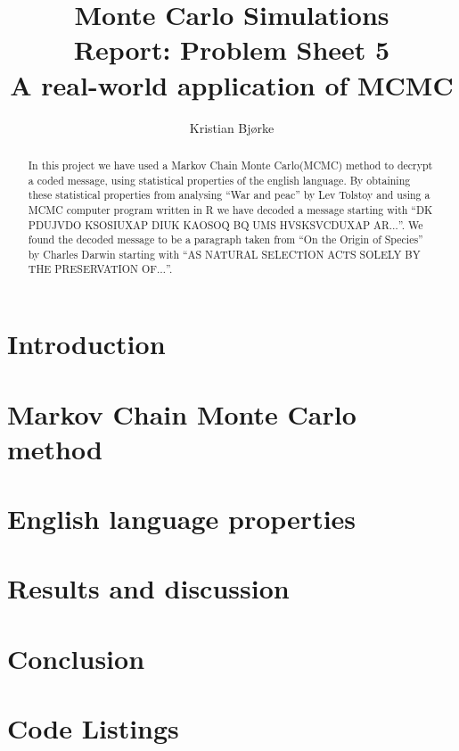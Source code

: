 \documentclass[a4paper, 11pt]{article}
\title{Monte Carlo Simulations \\
Report: Problem Sheet 5 \\ A real-world application of MCMC}
\author{Kristian Bjørke}
\begin{document}
\maketitle

\begin{abstract}
  In this project we have used a Markov Chain Monte Carlo(MCMC) method to
  decrypt a coded message, using statistical properties of the english
  language. By obtaining these statistical properties from analysing 
  ``War and peac'' by Lev Tolstoy and using a MCMC computer program
  written in R we have  decoded a message starting with ``DK PDUJVDO 
  KSOSIUXAP DIUK  KAOSOQ BQ UMS HVSKSVCDUXAP AR$\dots$''. We found the 
  decoded message to be a paragraph taken from ``On the Origin of 
  Species'' by Charles Darwin starting with ``AS NATURAL SELECTION ACTS 
  SOLELY BY THE PRESERVATION OF$\dots$''.
\end{abstract}


\section{Introduction}

\section{Markov Chain Monte Carlo method}

\section{English language properties}

\section{Results and discussion}

\section{Conclusion}

\section{Code Listings}
\end{document}
